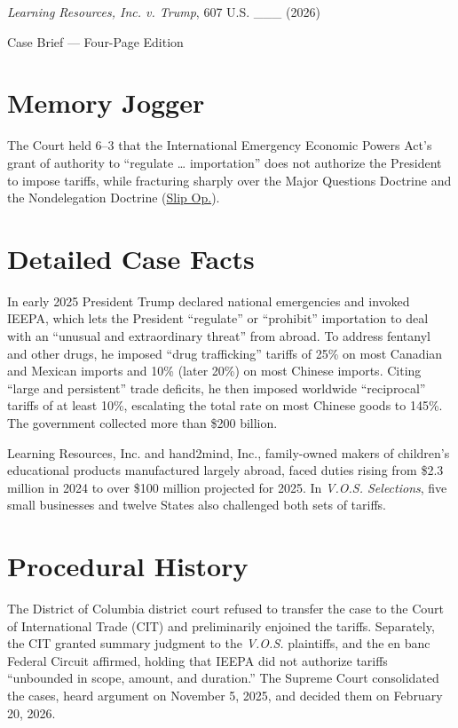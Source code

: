 \documentclass[12pt]{article}
\begin{document}
\begin{center}
{\LARGE \textit{Learning Resources, Inc. v. Trump}, 607 U.S. \_\_\_ (2026)\par}
\vspace{0.8em}
{\large Case Brief --- Four-Page Edition\par}
\end{center}
\vspace{1em}

\section{Memory Jogger}

The Court held 6--3 that the International Emergency Economic Powers Act's grant of authority to ``regulate \ldots{} importation'' does not authorize the President to impose tariffs, while fracturing sharply over the Major Questions Doctrine and the Nondelegation Doctrine (\href{https://www.supremecourt.gov/opinions/25pdf/24-1287_4gcj.pdf}{Slip Op.}).

\section{Detailed Case Facts}

In early 2025 President Trump declared national emergencies and invoked IEEPA, which lets the President ``regulate'' or ``prohibit'' importation to deal with an ``unusual and extraordinary threat'' from abroad. To address fentanyl and other drugs, he imposed ``drug trafficking'' tariffs of 25\% on most Canadian and Mexican imports and 10\% (later 20\%) on most Chinese imports. Citing ``large and persistent'' trade deficits, he then imposed worldwide ``reciprocal'' tariffs of at least 10\%, escalating the total rate on most Chinese goods to 145\%. The government collected more than \$200 billion.

Learning Resources, Inc. and hand2mind, Inc., family-owned makers of children's educational products manufactured largely abroad, faced duties rising from \$2.3 million in 2024 to over \$100 million projected for 2025. In \textit{V.O.S. Selections}, five small businesses and twelve States also challenged both sets of tariffs.

\section{Procedural History}

The District of Columbia district court refused to transfer the case to the Court of International Trade (CIT) and preliminarily enjoined the tariffs. Separately, the CIT granted summary judgment to the \textit{V.O.S.} plaintiffs, and the en banc Federal Circuit affirmed, holding that IEEPA did not authorize tariffs ``unbounded in scope, amount, and duration.'' The Supreme Court consolidated the cases, heard argument on November 5, 2025, and decided them on February 20, 2026.
\end{document}
